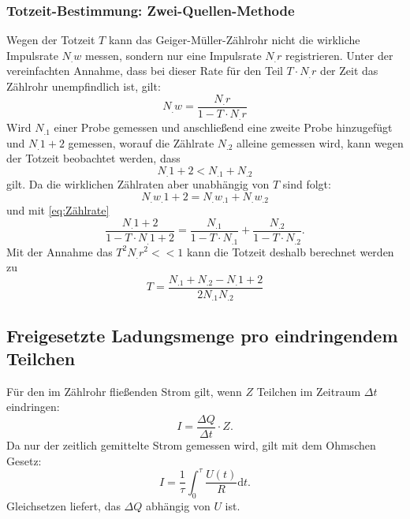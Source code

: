 \subsubsection{Totzeit-Bestimmung: Zwei-Quellen-Methode}
Wegen der Totzeit $T$ kann das Geiger-Müller-Zählrohr nicht die wirkliche Impulsrate $N_.w$ messen, sondern nur eine Impulsrate $N_.r$ registrieren. Unter der vereinfachten Annahme, dass bei dieser Rate für den Teil $T\cdot N_.r$ der Zeit das Zählrohr unempfindlich ist, gilt:
\begin{equation}
N_.w=\frac{N_.r}{1-T\cdot N_.r}\label{eq:Zählrate}
\end{equation}
Wird $N_.1$ einer Probe gemessen und anschließend eine zweite Probe hinzugefügt und $N_.{1+2}$ gemessen, worauf die Zählrate $N_.2$ alleine gemessen wird, kann wegen der Totzeit beobachtet werden, dass 
\[
N_.{1+2} < N_.1 + N_.2
\]
gilt.
Da die wirklichen Zählraten aber unabhängig von $T$ sind folgt:
\[
N_.{w_.{1+2}} = N_.{w_.1} + N_.{w_.2}
\]
und mit \eqref{eq:Zählrate}
\[
\frac{N_.{1+2}}{1-T\cdot N_.{1+2}}=\frac{N_.1}{1-T\cdot N_.1}+\frac{N_.2}{1-T\cdot N_.2} \text{.}
\]
Mit der Annahme das $T^2N_.r^2<<1$ kann die Totzeit deshalb berechnet werden zu 
\begin{equation}
T=\frac{N_.1+N_.2-N_.{1+2}}{2N_.1N_.2}\label{eq:T}
\end{equation}
\subsection{Freigesetzte Ladungsmenge pro eindringendem Teilchen}
Für den im Zählrohr fließenden Strom gilt, wenn $Z$ Teilchen im Zeitraum $\Delta t$ eindringen:
\begin{equation}
I=\frac{\Delta Q}{\Delta t}\cdot Z \label{eq:I}\text{.}
\end{equation}
Da nur der zeitlich gemittelte Strom gemessen wird, gilt mit dem Ohmschen Gesetz:
\[
I=\frac{1}{\tau}\int_0^{\tau}\frac{U(t)}{R}\mathrm{d}t \text{.}
\]
Gleichsetzen liefert, das $\Delta Q$ abhängig von $U$ ist.